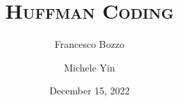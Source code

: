 \documentclass[
center,
]{beamer}
\title[Huffman Coding]{\textsc{Huffman Coding}}
\author[Bozzo - Yin]{Francesco Bozzo \and Michele Yin}
\institute[UniTN]{University of Trento}
\date{December 15, 2022}
\begin{document}
\begin{frame}
\titlepage
\end{frame}








% 
% 



%
% 
\end{document}
